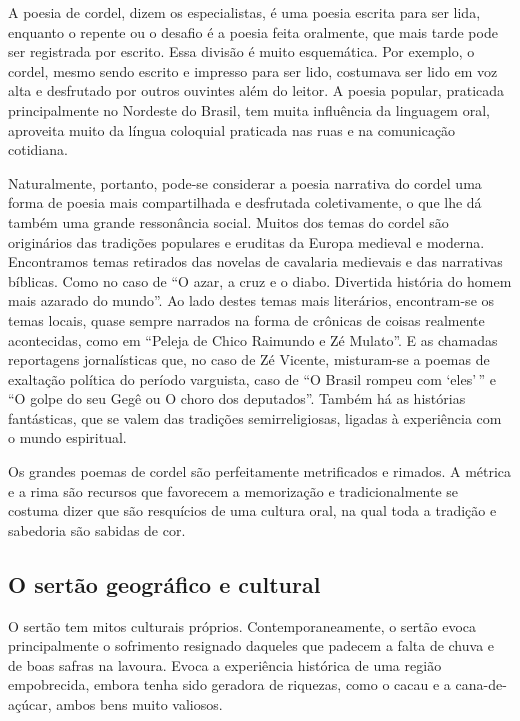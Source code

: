 A poesia de cordel, dizem os especialistas, é uma poesia escrita para
ser lida, enquanto o repente ou o desafio é a poesia feita oralmente,
que mais tarde pode ser registrada por escrito. Essa divisão é muito
esquemática. Por exemplo, o cordel, mesmo sendo escrito e impresso para
ser lido, costumava ser lido em voz alta e desfrutado por outros
ouvintes além do leitor. A poesia popular, praticada principalmente no
Nordeste do Brasil, tem muita influência da linguagem oral, aproveita
muito da língua coloquial praticada nas ruas e na comunicação
cotidiana. 

Naturalmente, portanto, pode-se considerar a poesia narrativa do cordel
uma forma de poesia mais compartilhada e desfrutada coletivamente, o
que lhe dá também uma grande ressonância social. Muitos dos temas do
cordel são originários das tradições populares e eruditas da Europa
medieval e moderna. Encontramos temas retirados das novelas de
cavalaria medievais e das narrativas bíblicas. Como no caso de
``O azar, a cruz e o diabo. Divertida história do
homem mais azarado do mundo''. Ao lado destes temas
mais literários, encontram-se os temas locais, quase sempre narrados na
forma de crônicas de coisas realmente acontecidas, como em
``Peleja de Chico Raimundo e Zé
Mulato''. E as chamadas reportagens jornalísticas que,
no caso de Zé Vicente, misturam-se a poemas de exaltação política do
período varguista, caso de ``O Brasil rompeu com
`eles'\,'' e ``O golpe do seu Gegê ou O choro dos
deputados''. Também há as histórias fantásticas, que
se valem das tradições semirreligiosas, ligadas à experiência com o
mundo espiritual. 

Os grandes poemas de cordel são perfeitamente metrificados e rimados. A
métrica e a rima são recursos que favorecem a memorização e
tradicionalmente se costuma dizer que são resquícios de uma cultura
oral, na qual toda a tradição e sabedoria são sabidas de cor. 


\subsection{O sertão geográfico e cultural}

O sertão tem mitos culturais próprios. Contemporaneamente, o sertão
evoca principalmente o sofrimento resignado daqueles que padecem a
falta de chuva e de boas safras na lavoura. Evoca a experiência
histórica de uma região empobrecida, embora tenha sido geradora de
riquezas, como o cacau e a cana-de-açúcar, ambos bens muito valiosos. 

